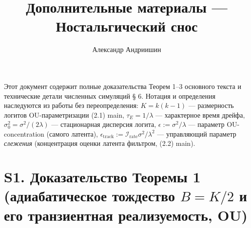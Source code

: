 \documentclass[12pt]{iopart}
\providecommand{\texorpdfstring}[2]{#1}
\begin{document}
\title[Дополнительные материалы]{Дополнительные материалы — Ностальгический снос}

\author{Александр Андриишин}

\address{Независимый исследователь; ORCID 0009-0000-4739-4017; alexander@andriishin.com}

\maketitle

Этот документ содержит полные доказательства Теорем 1--3 основного текста и технические детали численных симуляций § 6. Нотация и определения наследуются из работы \cite{Andriishin2026b} без переопределения: \(K = k(k-1)\) --- размерность логитов OU-параметризации (2.1) main, \(\tau_E = 1/\lambda\) --- характерное время дрейфа, \(\sigma_0^2 = \sigma^2/(2\lambda)\) --- стационарная дисперсия логита, \(\epsilon := \sigma^2/\lambda\) --- параметр OU-concentration (самого латента), \(\epsilon_{\text{track}} := \mathcal I_{\text{rate}}\sigma^2/\lambda^2\) --- управляющий параметр \emph{слежения} (концентрация оценки латента фильтром, (2.2) main).

\section{\texorpdfstring{S1. Доказательство Теоремы 1 (адиабатическое тождество \(B=K/2\) и его транзиентная реализуемость, OU)}{S1. Доказательство Теоремы 1 (адиабатическое тождество B=K/2 и его транзиентная реализуемость, OU)}}\label{s1.-ux434ux43eux43aux430ux437ux430ux442ux435ux43bux44cux441ux442ux432ux43e-ux442ux435ux43eux440ux435ux43cux44b-1-ux430ux434ux438ux430ux431ux430ux442ux438ux447ux435ux441ux43aux43eux435-ux442ux43eux436ux434ux435ux441ux442ux432ux43e-bk2-ux438-ux435ux433ux43e-ux442ux440ux430ux43dux437ux438ux435ux43dux442ux43dux430ux44f-ux440ux435ux430ux43bux438ux437ux443ux435ux43cux43eux441ux442ux44c-ou}
\end{document}
